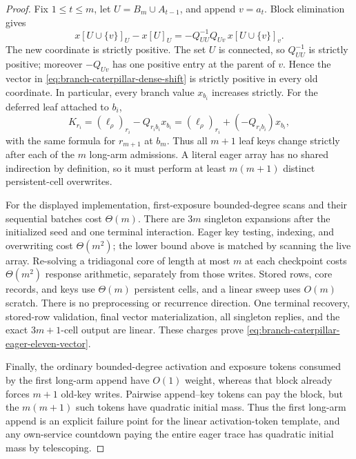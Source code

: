 \begin{proof}
Fix $1\leq t\leq m$, let $U=B_m\cup A_{t-1}$, and append $v=a_t$.
Block elimination gives
\begin{equation}
 x[U\cup\{v\}]_U-x[U]_U
 =-Q_{UU}^{-1}Q_{Uv}\,x[U\cup\{v\}]_v.
 \label{eq:branch-caterpillar-dense-shift}
\end{equation}
The new coordinate is strictly positive.  The set $U$ is connected, so
$Q_{UU}^{-1}$ is strictly positive; moreover $-Q_{Uv}$ has one positive
entry at the parent of $v$.  Hence the vector in
\eqref{eq:branch-caterpillar-dense-shift} is strictly positive in every old
coordinate.  In particular, every branch value $x_{b_i}$ increases strictly.
For the deferred leaf attached to $b_i$,
\begin{equation*}
 K_{r_i}=(\ell_\rho)_{r_i}-Q_{r_i b_i}x_{b_i}
          =(\ell_\rho)_{r_i}+(-Q_{r_i b_i})x_{b_i},
\end{equation*}
with the same formula for $r_{m+1}$ at $b_m$.  Thus all $m+1$ leaf keys
change strictly after each of the $m$ long-arm admissions.  A literal eager
array has no shared indirection by definition, so it must perform at least
$m(m+1)$ distinct persistent-cell overwrites.

For the displayed implementation, first-exposure bounded-degree scans and
their sequential batches cost $\Theta(m)$.  There are $3m$ singleton
expansions after the initialized seed and one terminal interaction.  Eager
key testing, indexing, and overwriting cost $\Theta(m^2)$; the lower bound
above is matched by scanning the live array.  Re-solving a tridiagonal core of
length at most $m$ at each checkpoint costs $\Theta(m^2)$ response arithmetic,
separately from those writes.  Stored rows, core records, and keys use
$\Theta(m)$ persistent cells, and a linear sweep uses $O(m)$ scratch.  There
is no preprocessing or recurrence direction.  One terminal recovery,
stored-row validation, final vector materialization, all singleton replies,
and the exact $3m+1$-cell output are linear.  These charges prove
\eqref{eq:branch-caterpillar-eager-eleven-vector}.

Finally, the ordinary bounded-degree activation and exposure tokens consumed
by the first long-arm append have $O(1)$ weight, whereas that block already
forces $m+1$ old-key writes.  Pairwise append--key tokens can pay the block,
but the $m(m+1)$ such tokens have quadratic initial mass.  Thus the first
long-arm append is an explicit failure point for the linear activation-token
template, and any own-service countdown paying the entire eager trace has
quadratic initial mass by telescoping.
\end{proof}

